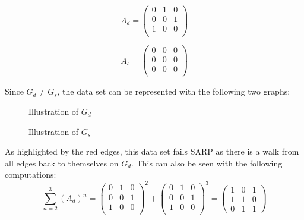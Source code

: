 \documentclass{article} %
\begin{document}
\begin{minipage}{0.5\linewidth}
\[A_d = \begin{pmatrix}
0 & 1 & 0\\
0 & 0 & 1 \\
1 & 0 & 0 \\
\end{pmatrix}
\]
\end{minipage}
\begin{minipage}{0.5\linewidth}
\[A_s = \begin{pmatrix}
0 & 0 & 0\\
0 & 0 & 0 \\
0 & 0 & 0 \\
\end{pmatrix}
\]
\end{minipage}
Since $G_d\not=G_s$, the data set can be represented with the following two graphs:
\begin{minipage}{0.5\linewidth}
\begin{figure}[H]
\centering
{}
\caption{Illustration of $G_d$} \label{fig:example2_graph_Gd}
\end{figure}
\end{minipage}
\begin{minipage}{0.5\linewidth}
\begin{figure}[H]
\centering
{}
\caption{Illustration of $G_s$} \label{fig:example2_graph_Gd}
\end{figure}
\end{minipage}

As highlighted by the red edges, this data set fails SARP as there is a walk from all edges back to themselves on $G_d$. This can also be seen with the following computations:
\[\sum_{n=2}^3(A_d)^n=\begin{pmatrix}
0 & 1 & 0\\
0 & 0 & 1 \\
1 & 0 & 0 \\
\end{pmatrix}^2+
\begin{pmatrix}
0 & 1 & 0\\
0 & 0 & 1 \\
1 & 0 & 0 \\
\end{pmatrix}^3=
\begin{pmatrix}
1&0&1\\
1&1&0\\
0&1&1
\end{pmatrix}
\]
\end{document}
